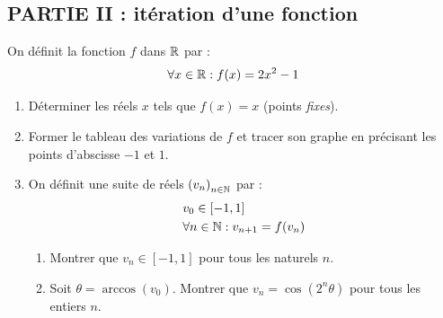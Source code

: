 \subsection*{PARTIE II : itération d'une fonction}
On définit la fonction $f$ dans $\mathbb{R}$ par :
\begin{displaymath}
 \forall x\in \mathbb{R}: f(x) = 2x^2 - 1
\end{displaymath}
\begin{enumerate}
 \item Déterminer les réels $x$ tels que $f(x)=x$ (points \emph{fixes}).
 \item Former le tableau des variations de $f$ et tracer son graphe en précisant les points d'abscisse $-1$ et $1$.
 \item On définit une suite de réels $\left( v_n\right) _{n\in \mathbb{N}}$ par :
\begin{align*}
  &v_0 \in [-1,1]\\
  &\forall n\in \mathbb{N} : v_{n+1}= f(v_n)
\end{align*}
\begin{enumerate}
 \item Montrer que $v_n\in [-1,1]$ pour tous les naturels $n$.
 \item Soit $\theta=\arccos(v_0)$. Montrer que $v_n = \cos(2^n \theta)$ pour tous les entiers $n$.
\end{enumerate}
\end{enumerate}

